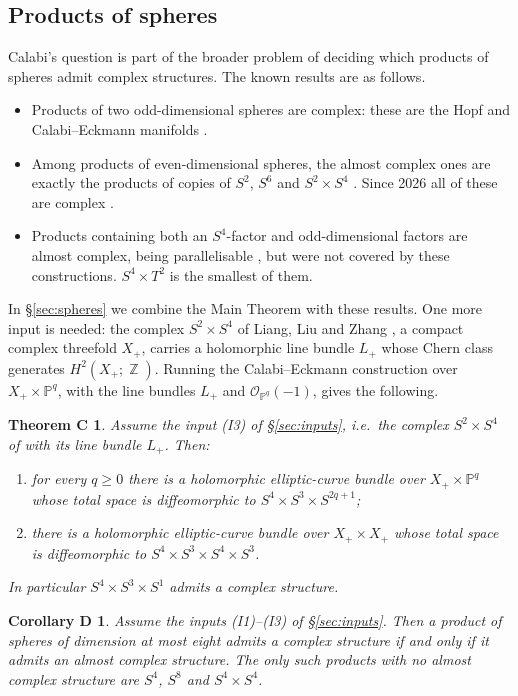 \documentclass{article}
\DeclareMathOperator{\Z}{\mathbb{Z}}
\newtheorem*{theoremC}{Theorem C}
\newtheorem*{corollaryD}{Corollary D}
\theoremstyle{definition}
\theoremstyle{plain}
\newcommand{\PP}{\mathbb{P}}
\newcommand{\cO}{\mathcal{O}}
\begin{document}
\subsection{Products of spheres}\label{sec:introspheres}
Calabi's question is part of the broader problem of deciding which products of spheres
admit complex structures. The known results are as follows.
\begin{itemize}
\item Products of two odd-dimensional spheres are complex: these are the Hopf and
  Calabi--Eckmann manifolds \cite{CalabiEckmann53}.
\item Among products of even-dimensional spheres, the almost complex ones are exactly
  the products of copies of $S^2$, $S^6$ and $S^2\times S^4$ \cite{Sutherland65}. Since
  2026 all of these are complex \cite{AC26,Engel26,GFL26,LLZ26}.
\item Products containing both an $S^4$-factor and odd-dimensional factors are almost
  complex, being parallelisable \cite{Staples67}, but were not covered by these
  constructions. $S^4\times T^2$ is the smallest of them.
\end{itemize}

In \S\ref{sec:spheres} we combine the Main Theorem with these results. One more input is
needed: the complex $S^2\times S^4$ of Liang, Liu and Zhang \cite{LLZ26}, a compact complex
threefold $X_+$, carries a holomorphic line bundle $L_+$ whose Chern class generates
$H^2(X_+;\Z)$. Running the Calabi--Eckmann construction over $X_+\times\PP^q$, with the
line bundles $L_+$ and $\cO_{\PP^q}(-1)$, gives the following.

\begin{theoremC}
Assume the input \textup{(I3)} of \S\ref{sec:inputs}, i.e.\ the complex
$S^2\times S^4$ of \cite{LLZ26} with its line bundle $L_+$. Then:
\begin{enumerate}
\item for every $q\ge0$ there is a holomorphic elliptic-curve bundle over
  $X_+\times\PP^q$ whose total space is diffeomorphic to $S^4\times S^3\times S^{2q+1}$;
\item there is a holomorphic elliptic-curve bundle over $X_+\times X_+$ whose total space
  is diffeomorphic to $S^4\times S^3\times S^4\times S^3$.
\end{enumerate}
In particular $S^4\times S^3\times S^1$ admits a complex structure.
\end{theoremC}

\begin{corollaryD}
Assume the inputs \textup{(I1)--(I3)} of \S\ref{sec:inputs}. Then a product of spheres
of dimension at most eight admits a complex structure if and only if it admits an
almost complex structure. The only such products with no almost complex structure are
$S^4$, $S^8$ and $S^4\times S^4$.
\end{corollaryD}
\end{document}
